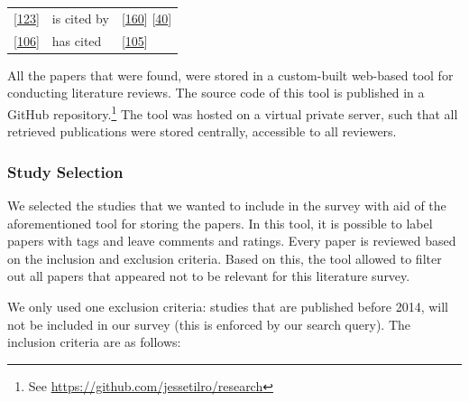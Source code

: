 \documentclass[]{book}
\let\rmarkdownfootnote\footnote%
\def\footnote{\protect\rmarkdownfootnote}
\begin{document}
\begin{longtable}[]{@{}lll@{}}
\begin{minipage}[t]{0.23\columnwidth}\raggedright\strut
{[}\protect\hyperlink{ref-mantyla2015a}{123}{]}\strut
\end{minipage} & \begin{minipage}[t]{0.18\columnwidth}\raggedright\strut
is cited by\strut
\end{minipage} & \begin{minipage}[t]{0.25\columnwidth}\raggedright\strut
{[}\protect\hyperlink{ref-rodriguez2017a}{160}{]}
{[}\protect\hyperlink{ref-cesar2017a}{40}{]}\strut
\end{minipage}\tabularnewline
\begin{minipage}[t]{0.23\columnwidth}\raggedright\strut
{[}\protect\hyperlink{ref-laukkanen2018a}{106}{]}\strut
\end{minipage} & \begin{minipage}[t]{0.18\columnwidth}\raggedright\strut
has cited\strut
\end{minipage} & \begin{minipage}[t]{0.25\columnwidth}\raggedright\strut
{[}\protect\hyperlink{ref-laukkanen2017a}{105}{]}\strut
\end{minipage}\tabularnewline
\bottomrule
\end{longtable}

All the papers that were found, were stored in a custom-built web-based
tool for conducting literature reviews. The source code of this tool is
published in a GitHub repository.\footnote{See
  \url{https://github.com/jessetilro/research}} The tool was hosted on a
virtual private server, such that all retrieved publications were stored
centrally, accessible to all reviewers.

\subsubsection{Study Selection}\label{study-selection}

We selected the studies that we wanted to include in the survey with aid
of the aforementioned tool for storing the papers. In this tool, it is
possible to label papers with tags and leave comments and ratings. Every
paper is reviewed based on the inclusion and exclusion criteria. Based
on this, the tool allowed to filter out all papers that appeared not to
be relevant for this literature survey.

We only used one exclusion criteria: studies that are published before
2014, will not be included in our survey (this is enforced by our search
query). The inclusion criteria are as follows:
\end{document}

